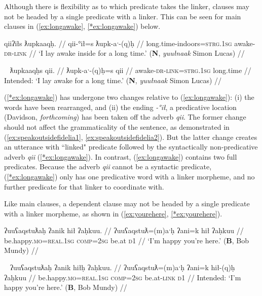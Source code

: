 Although there is flexibility as to which predicate takes the linker, clauses may not be headed by a single predicate with a linker. This can be seen for main clauses in (\ref{ex:longawake}, \ref{*ex:longawake}) below.

\ex \label{ex:longawake}
\begingl
\glpreamble qiiʔiłs ƛupkaaqḥ. //
\gla qii-°ił=s ƛupk-aˑ-(q)ḥ //
\glb long.time-indoors=\textsc{strg.1sg} awake-\textsc{dr}-\textsc{link} //
\glft `I lay awake inside for a long time.' (\textbf{N}, \textit{yuułnaak} Simon Lucas) //
\endgl
\xe

\ex~ \label{*ex:longawake}
\begingl
\glpreamble *ƛupkaaqḥs qii. //
\gla ƛupk-aˑ-(q)ḥ=s qii //
\glb awake-\textsc{dr}-\textsc{link}=\textsc{strg.1sg} long.time //
\glft Intended: `I lay awake for a long time.' (\textbf{N}, \textit{yuułnaak} Simon Lucas) //
\endgl
\xe

(\ref{*ex:longawake}) has undergone two changes relative to (\ref{ex:longawake}): (i) the words have been rearranged, and (ii) the ending \textit{-°ił}, a predicative location (Davidson, \textit{forthcoming}) has been taken off the adverb \textit{qii}. The former change should not affect the grammaticality of the sentence, as demonstrated in (\ref{ex:speakoutsidefidelia1}, \ref{ex:speakoutsidefidelia2}). But the latter change creates an utterance with ``linked" predicate followed by the syntactically non-predicative adverb \textit{qii} (\ref{*ex:longawake}). In contrast, (\ref{ex:longawake}) contains two full predicates. Because the adverb \textit{qii} cannot be a syntactic predicate, (\ref{*ex:longawake}) only has one predicative word with a linker morpheme, and no further predicate for that linker to coordinate with.

Like main clauses, a dependent clause may not be headed by a single predicate with a linker morpheme, as shown in (\ref{ex:yourehere}, \ref{*ex:yourehere}).

\ex \label{ex:yourehere}
\begingl
\glpreamble ʔuuʕaqstuƛaḥ ʔanik hił ʔaḥkuu. //
\gla ʔuuʕaqstuƛ=(m)aˑḥ ʔani=k hił ʔaḥkuu //
\glb be.happy.\textsc{mo}=\textsc{real.1sg} \textsc{comp}=\textsc{2sg} be.at \textsc{d1} //
\glft `I'm happy you're here.' (\textbf{B}, Bob Mundy) //
\endgl
\xe

\ex~ \label{*ex:yourehere}
\begingl
\glpreamble *ʔuuʕaqstuƛaḥ ʔanik hiłḥ ʔaḥkuu. //
\gla ʔuuʕaqstuƛ=(m)aˑḥ ʔani=k hił-(q)ḥ ʔaḥkuu //
\glb be.happy.\textsc{mo}=\textsc{real.1sg} \textsc{comp}=\textsc{2sg} be.at-\textsc{link} \textsc{d1} //
\glft Intended: `I'm happy you're here.' (\textbf{B}, Bob Mundy) //
\endgl
\xe

